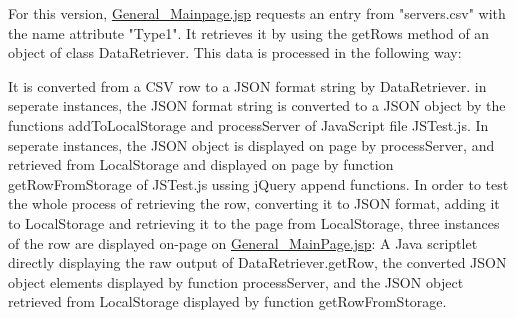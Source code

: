 For this version, \url{General_Mainpage.jsp} requests an entry from "servers.csv" with the name attribute "Type1". It retrieves it by using the getRows method of an object of class DataRetriever. 
This data is processed in the following way:

It is converted from a CSV row to a JSON format string by DataRetriever.
in seperate instances, the JSON format string is converted to a JSON object by the functions addToLocalStorage and processServer of JavaScript file JSTest.js.
In seperate instances, the JSON object is displayed on page by processServer, and retrieved from LocalStorage and displayed on page by function getRowFromStorage of JSTest.js ussing jQuery append functions.
In order to test the whole process of retrieving the row, converting it to JSON format, adding it to LocalStorage and retrieving it to the page from LocalStorage, three instances of the row are displayed on-page on \url{General_MainPage.jsp}: A Java scriptlet directly displaying the raw output of DataRetriever.getRow, the converted JSON object elements displayed by function processServer, and the JSON object retrieved from LocalStorage displayed by function getRowFromStorage.

